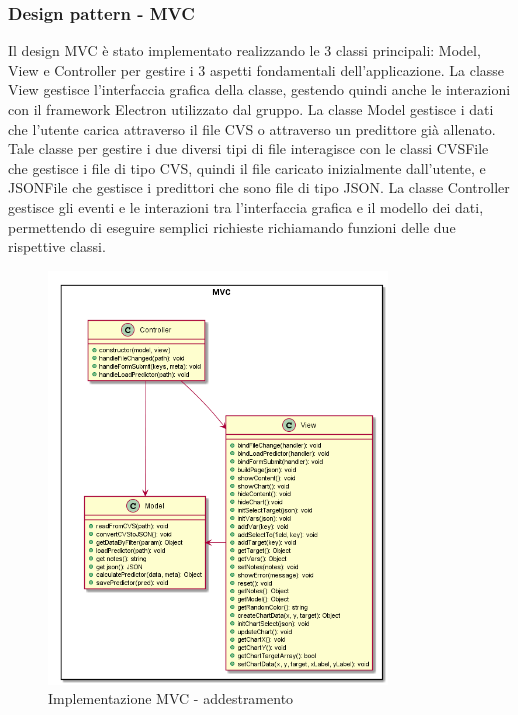 \documentclass[../manuale-sviluppatore.tex]{subfiles}
\begin{document}
\subsubsection{Design pattern - MVC}
\label{ssec:design_pattern_mvc}
Il design MVC è stato implementato realizzando le 3 classi principali: Model, View e Controller per gestire i 3 aspetti fondamentali dell'applicazione.
La classe View gestisce l'interfaccia grafica della classe, gestendo quindi anche le interazioni con il framework Electron utilizzato dal gruppo.
La classe Model gestisce i dati che l'utente carica attraverso il file CVS o attraverso un predittore già allenato. Tale classe per gestire i due diversi tipi di file interagisce con le classi
CVSFile che gestisce i file di tipo CVS, quindi il file caricato inizialmente dall'utente, e JSONFile che gestisce i predittori che sono file di tipo JSON.
La classe Controller gestisce gli eventi e le interazioni tra l'interfaccia grafica e il modello dei dati, permettendo di eseguire semplici richieste richiamando funzioni delle due rispettive classi.

\begin{figure}[H]
    \begin{center}
         \includegraphics[width=9cm]{img/mvcTA.png}
         \caption{Implementazione MVC - addestramento}
         \label{fig:MVC}
     \end{center}
 \end{figure}
\end{document}
